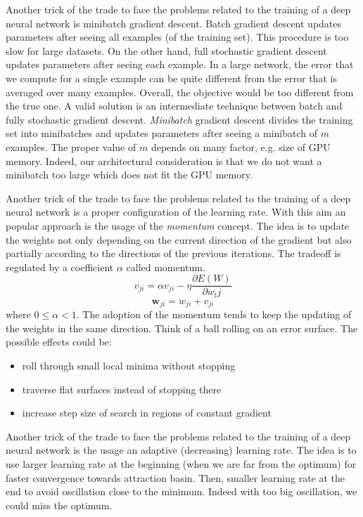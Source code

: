 Another trick of the trade to face the problems related to the training of a deep
neural network is minibatch gradient descent. Batch gradient descent updates
parameters after seeing all examples (of the training set). This procedure is too
slow for large datasets. On the other hand, full stochastic gradient descent updates
parameters after seeing each example. In a large network, the error that we compute
for a single example can be quite different from the error that is averaged over
many examples. Overall, the objective would be too different from the true one.
A valid solution is an intermediate technique between batch and fully stochastic
gradient descent. \textit{Minibatch} gradient descent divides the training set
into minibatches and updates parameters after seeing a minibatch of $m$ examples.
The proper value of $m$ depends on many factor, e.g. size of GPU memory. Indeed,
our architectural consideration is that we do not want a minibatch too large which
does not fit the GPU memory.
\newline

Another trick of the trade to face the problems related to the training of a deep
neural network is a proper configuration of the learning rate. With this aim an
popular approach is the usage of the \textit{momentum} concept. The idea is to
update the weights not only depending on the current direction of the gradient
but also partially according to the directions of the previous iterations. The tradeoff
is regulated by a coefficient $\alpha$ called momentum.
\[
	v_{ji}= \alpha v_{ji}- \eta \frac{\partial E(W)}{\partial w_{l}j}
\]
\[
	\pmb{w}_{ji}= w_{ji}+ v_{ji}
\]
where $0 \leq \alpha < 1$. The adoption of the momentum tends to keep the updating
of the weights in the same direction. Think of a ball rolling on an error
surface. The possible effects could be:
\begin{itemize}
	\item roll through small local minima without stopping

	\item traverse flat surfaces instead of stopping there

	\item increase step size of search in regions of constant gradient
\end{itemize}

Another trick of the trade to face the problems related to the training of a deep
neural network is the usage an adaptive (decreasing) learning rate. The idea is
to use larger learning rate at the beginning (when we are far from the optimum)
for faster convergence towards attraction basin. Then, smaller learning rate at
the end to avoid oscillation close to the minimum. Indeed with too big oscillation,
we could miss the optimum.

